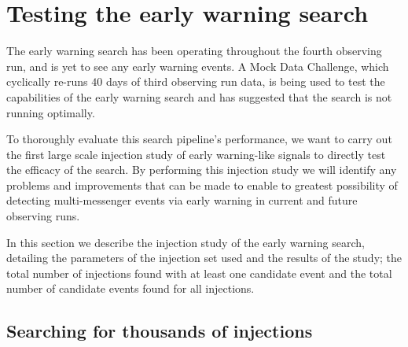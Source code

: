 \section{\label{6:sec:injection-tests}Testing the early warning search}

The early warning search has been operating throughout the fourth observing run, and is yet to see any early warning events. A Mock Data Challenge, which cyclically re-runs $40$ days of third observing run data, is being used to test the capabilities of the early warning search and has suggested that the search is not running optimally.

To thoroughly evaluate this search pipeline's performance, we want to carry out the first large scale injection study of early warning-like \gwadj signals to directly test the efficacy of the search. By performing this injection study we will identify any problems and improvements that can be made to enable to greatest possibility of detecting multi-messenger events via early warning in current and future observing runs.

In this section we describe the injection study of the early warning search, detailing the parameters of the injection set used and the results of the study; the total number of injections found with at least one candidate event and the total number of candidate events found for all injections.

\subsection{\label{6:sec:injection-set}Searching for thousands of \gwadj injections}


